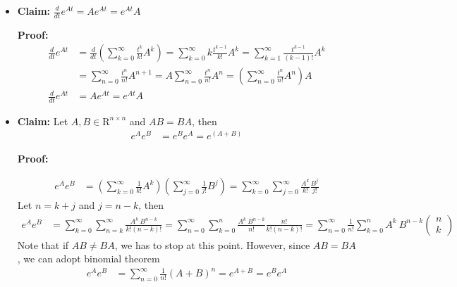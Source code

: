 \documentclass[twoside]{article}
\begin{document}
\begin{itemize}

 \item \textbf{Claim:} $ \frac{d}{d t} e^{A t} = A e^{A t} = e^{A t} A$

\textbf{Proof:} 
%
\begin{align*}
 	\frac{d}{dt} e^{A t} &= \frac{d}{dt} \left( \sum\limits_{k=0}^{\infty} \frac{t^{k}}{k!} A^k \right) =
	\sum\limits_{k=0}^{\infty} k \frac{t^{k-1}}{k!} A^k = \sum\limits_{k=1}^{\infty} \frac{t^{k-1}}{(k-1)!} A^k \\
	&= \sum\limits_{n=0}^{\infty} \frac{t^{n}}{n!} A^{n+1} = A \sum\limits_{n=0}^{\infty} \frac{t^{n}}{n!} A^{n}   = \left( \sum\limits_{n=0}^{\infty} \frac{t^{n}}{n!} A^{n} \right) A
	\\
	\frac{d}{dt} e^{A t}  &= A e^{A t} = e^{A t} A
\end{align*}

\item \textbf{Claim:} Let $A , B \in \mathrm{R}^{n \times n}$ and $A B
  = B A$, then 
%
\begin{align*}
	e^{A} e^{B} &= e^{B} e^{A} = e^{(A + B)} 
\end{align*}

\textbf{Proof:} 

\begin{align*}
	e^{A} e^{B} &= \left(\sum\limits_{k=0}^{\infty} \frac{1}{k!} A^k \right) \left(\sum\limits_{j=0}^{\infty} \frac{1}{j!} B^j \right) 
	= \sum\limits_{k=0}^{\infty} \sum\limits_{j=0}^{\infty} \frac{A^k}{k!} \frac{B^j}{j!} 
\end{align*}
%
Let $n = k + j$ and $j = n - k$, then
%
\begin{align*}
	e^{A} e^{B} &= \sum\limits_{k=0}^{\infty} \sum\limits_{n=k}^{\infty} \frac{A^k \ B^{n-k}}{k! (n-k)!} 
	= \sum\limits_{n=0}^{\infty} \sum\limits_{k=0}^{n} \frac{A^k \ B^{n-k}}{n!} \frac{n!}{k! (n-k)!}  
    = \sum\limits_{n=0}^{\infty} \frac{1}{n!} \sum\limits_{k=0}^{n} A^k \ B^{n-k}
    \left( \begin{array}{c} n \\ k \end{array} \right) 
\end{align*}
%
Note that if $A B \neq B A$, we has to stop at this point. However, since $A B = B A$, we can adopt binomial theorem 
%
\begin{align*}
	e^{A} e^{B} &= \sum\limits_{n=0}^{\infty} \frac{1}{n!} (A+B)^{n} = e^{A+B} = e^{B} e^{A}
\end{align*}


\end{itemize}
\end{document}
